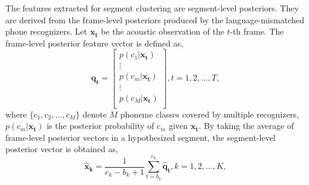 \documentclass[a4paper]{article}
\begin{document}

The features extracted for segment clustering are segment-level posteriors. They are derived from the frame-level posteriors produced by the language-mismatched phone recognizers. Let $\bm{x_t}$ be the acoustic observation of the $t$-th frame. The frame-level posterior feature vector is defined as, 
\begin{equation}  
 \bm{q_t} =  \left[  
  \begin{array}{c}  
          p(c_1 \vert \bm{x_t}) \\  
          \vdots \\  
          p(c_m \vert \bm{x_t}) \\
          \vdots \\
          p(c_M \vert \bm{x_t}) \\
 \end{array}  
 \right], t=1, 2, \ldots, T, 
\end{equation}
where $\{c_1, c_2, \ldots, c_M\}$ denote $M$ phoneme classes covered by multiple recognizers, $p(c_m \vert \bm{x_t})$ is the posterior probability of $c_m$ given $\bm{x_t}$. By taking the average of frame-level posterior vectors in a hypothesized segment, the segment-level posterior vector is obtained as,
\begin{equation}
\bm{\hat{x}_k} = \frac{1}{e_k - b_k +1} \sum\limits_{t = b_k}^{e_k}\bm{\hat{q}_t}, k=1, 2,\ldots, K, 
\end{equation}
\end{document}
